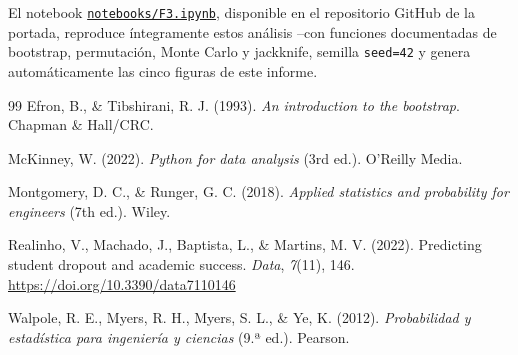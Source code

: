 \documentclass[11pt,a4paper]{article}
\begin{document}
El notebook \texttt{\href{https://github.com/dark452/mcdi501-grupo1/blob/main/notebooks/F3.ipynb}{notebooks/F3.ipynb}},
disponible en el repositorio GitHub de la portada, reproduce íntegramente estos análisis --con
funciones documentadas de bootstrap, permutación, Monte Carlo y jackknife, semilla
\texttt{seed=42} y genera automáticamente las cinco figuras de este informe.


\begin{thebibliography}{99}
Efron, B., \& Tibshirani, R. J. (1993). \textit{An introduction to the bootstrap}. Chapman \& Hall/CRC.

McKinney, W. (2022). \textit{Python for data analysis} (3rd ed.). O'Reilly Media.

Montgomery, D. C., \& Runger, G. C. (2018). \textit{Applied statistics and probability for engineers} (7th ed.). Wiley.

Realinho, V., Machado, J., Baptista, L., \& Martins, M. V. (2022). Predicting student dropout and academic success. \textit{Data}, \textit{7}(11), 146. \url{https://doi.org/10.3390/data7110146}

Walpole, R. E., Myers, R. H., Myers, S. L., \& Ye, K. (2012). \textit{Probabilidad y estadística para ingeniería y ciencias} (9.ª ed.). Pearson.
\end{thebibliography}
\end{document}
